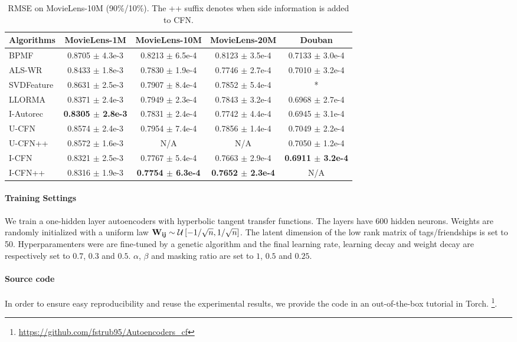 \documentclass{article}
\newcommand{\mtx}[1]{\ensuremath{\mathbf{#1}}}
\begin{document}
\begin{table*}[t]
\centering
\begin{tabular}{lcccc}
\hline
Algorithms  & MovieLens-1M                     & MovieLens-10M             & MovieLens-20M    & Douban\\
\hline
BPMF		&         0.8705  $\pm$ 4.3e-3  &          0.8213 $\pm$ 6.5e-4  &           0.8123 $\pm$ 3.5e-4     & 0.7133 $\pm$ 3.0e-4 \\
ALS-WR      &         0.8433  $\pm$ 1.8e-3  &          0.7830 $\pm$ 1.9e-4  &           0.7746 $\pm$ 2.7e-4     & 0.7010 $\pm$ 3.2e-4 \\
SVDFeature  &         0.8631  $\pm$ 2.5e-3  &          0.7907 $\pm$ 8.4e-4  &           0.7852 $\pm$ 5.4e-4     &              *      \\
LLORMA		&         0.8371  $\pm$ 2.4e-3  &          0.7949 $\pm$ 2.3e-4  &          0.7843 $\pm$ 3.2e-4      & 0.6968 $\pm$ 2.7e-4   \\
I-Autorec   &         \textbf{0.8305 $\pm$ 2.8e-3} &   0.7831 $\pm$ 2.4e-4  &          0.7742 $\pm$ 4.4e-4      & 0.6945 $\pm$ 3.1e-4 \\
\hline
U-CFN       &         0.8574  $\pm$ 2.4e-3  &          0.7954 $\pm$ 7.4e-4  &           0.7856 $\pm$ 1.4e-4     & 0.7049 $\pm$ 2.2e-4 \\
U-CFN++     &         0.8572  $\pm$ 1.6e-3  &                N/A            &                 N/A               & 0.7050 $\pm$ 1.2e-4 \\
I-CFN       &         0.8321  $\pm$ 2.5e-3  &          0.7767 $\pm$ 5.4e-4  &           0.7663 $\pm$ 2.9e-4     & \textbf{0.6911 $\pm$ 3.2e-4} \\
I-CFN++     &         0.8316  $\pm$ 1.9e-3  &  \textbf{0.7754 $\pm$ 6.3e-4} &   \textbf{0.7652 $\pm$ 2.3e-4}       &           N/A      \\
\hline
\end{tabular}
\caption{RMSE on MovieLens-10M (90\%/10\%). The ++ suffix denotes when side information is added to CFN.}
\label{tab:RMSE}
\end{table*}

\paragraph{Training Settings}
We train a one-hidden layer autoencoders with hyperbolic tangent transfer functions. The layers have $600$ hidden neurons. Weights are randomly initialized  with a uniform law
$\mtx{W_{ij}} \sim {\cal U}\left[-1/\sqrt{n}, 1/\sqrt{n}\right]$.
The latent dimension of the low rank matrix of tags/friendships is set to 50. Hyperparamenters were are fine-tuned by a genetic algorithm and the final learning rate, learning decay and weight decay are respectively set to $0.7$, $0.3$ and $0.5$. $\alpha$, $\beta$ and masking ratio are set to $1$, $0.5$ and $0.25$.  \paragraph{Source code} 
In order to ensure easy reproducibility and reuse the experimental results, we provide the code in an out-of-the-box tutorial in Torch. 
\footnote{
\url{https://github.com/fstrub95/Autoencoders_cf}
}. 
\end{document}
